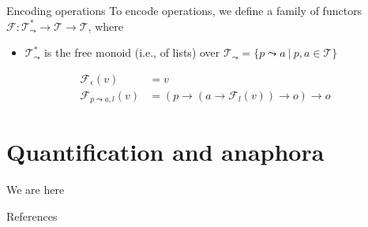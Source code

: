 \documentclass[presentation]{beamer}
\def\divd{\ |\ }
\def\ra{\rightarrow}
\begin{document}
\begin{frame}[label={sec:org39039d8}]{Encoding operations}
To encode operations, we define a family of functors \(\mathcal{F} : \mathcal{T}_\leadsto^* \ra \mathcal{T} \ra \mathcal{T}\), where
\begin{itemize}
\item \(\mathcal{T}_\leadsto^*\) is the free monoid (i.e., of lists) over \(\mathcal{T}_\leadsto = \{p \leadsto a \divd p, a \in \mathcal{T}\}\)

\pause
\end{itemize}
\begin{align*}
\mathcal{F}_\epsilon(v) &= v\\[2mm]
\mathcal{F}_{p \leadsto a, l}(v) &= (p \ra (a \ra \mathcal{F}_l(v)) \ra o) \ra o 
\end{align*}
\end{frame}

\section{Quantification and anaphora}
\label{sec:org4ad5c10}

\begin{frame}[label={sec:org8da26b5}]{We are here}
\tableofcontents[currentsection]
\end{frame}

\begin{frame}[allowframebreaks]{References}

\end{frame}
\end{document}
